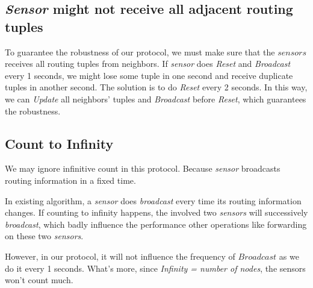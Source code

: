 \documentclass[a4paper]{article}
\begin{document}
\subsection{\emph{Sensor} might not receive all adjacent routing tuples}
To guarantee the robustness of our protocol, we must make sure that the $sensors$ receives all routing tuples from neighbors. If \emph{sensor} does \emph{Reset} and \emph{Broadcast} every 1 seconds, we might lose some tuple in one second and receive duplicate tuples in another second. The solution is to do \emph{Reset} every 2 seconds. In this way, we can \emph{Update} all neighbors' tuples and \emph{Broadcast} before \emph{Reset}, which guarantees the robustness.

\subsection{Count to Infinity}
We may ignore infinitive count in this protocol. Because \emph{sensor} broadcasts routing information in a fixed time.

In existing algorithm, a \emph{sensor} does \emph{broadcast} every time its routing information changes. If counting to infinity happens, the involved two \emph{sensors} will successively \emph{broadcast}, which badly influence the performance other operations like forwarding on these two \emph{sensors}.

However, in our protocol, it will not influence the frequency of $Broadcast$ as we do it every 1 seconds. What's more, since \emph{Infinity = number of nodes}, the sensors won't count much. 
\end{document}
